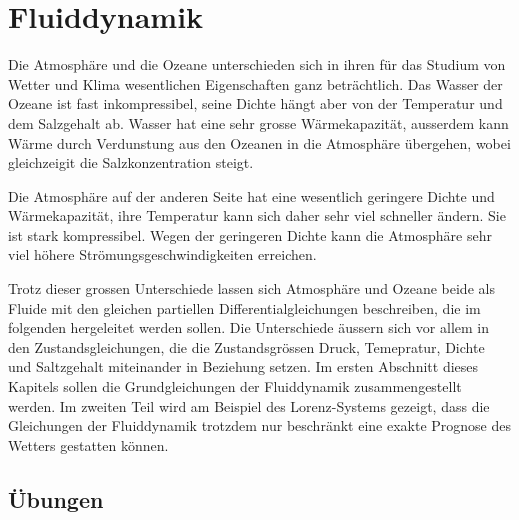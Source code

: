 %
%
%
\chapter{Fluiddynamik\label{chapter:fluiddynamik}}
\rhead{}
Die Atmosphäre und die Ozeane unterschieden sich in ihren
für das Studium von Wetter und Klima wesentlichen Eigenschaften
ganz beträchtlich.
Das Wasser der Ozeane ist fast inkompressibel, seine Dichte hängt aber
von der Temperatur und dem Salzgehalt ab.
Wasser hat eine sehr grosse Wärmekapazität, ausserdem kann Wärme durch
Verdunstung aus den Ozeanen in die Atmosphäre übergehen, wobei gleichzeigit
die Salzkonzentration steigt.

Die Atmosphäre auf der anderen Seite hat eine wesentlich geringere
Dichte und Wärmekapazität, ihre Temperatur kann sich daher sehr viel
schneller ändern.
Sie ist stark kompressibel.
Wegen der geringeren Dichte kann die Atmosphäre sehr viel höhere
Strömungsgeschwindigkeiten erreichen.

Trotz dieser grossen Unterschiede lassen sich Atmosphäre und Ozeane
beide als Fluide mit den gleichen partiellen Differentialgleichungen
beschreiben, die im folgenden hergeleitet werden sollen.
Die Unterschiede äussern sich vor allem in den Zustandsgleichungen,
die die Zustandsgrössen Druck, Temepratur, Dichte und Saltzgehalt
miteinander in Beziehung setzen.
Im ersten Abschnitt dieses Kapitels sollen die Grundgleichungen
der Fluiddynamik zusammengestellt werden.
Im zweiten Teil wird am Beispiel des Lorenz-Systems gezeigt, dass
die Gleichungen der Fluiddynamik trotzdem nur beschränkt eine exakte
Prognose des Wetters gestatten können.






\section*{Übungen}
\begin{uebungsaufgaben}
\item

\item

\item

\end{uebungsaufgaben}


